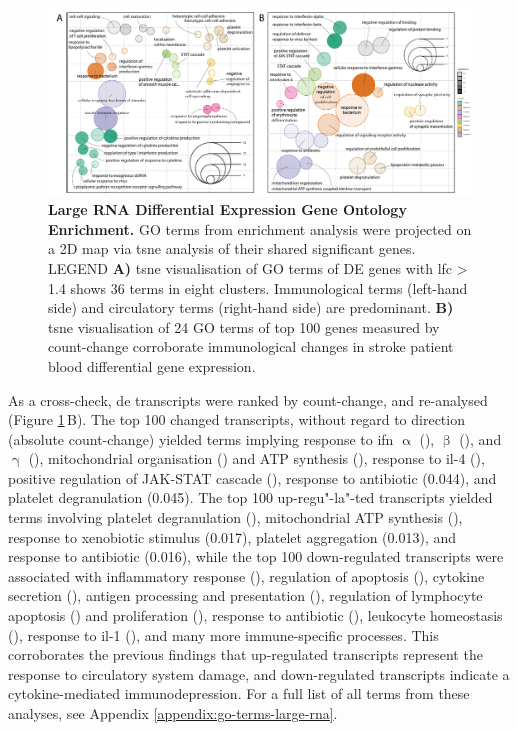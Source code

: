 \begin{figure}
\includegraphics[width=\textwidth]{figures/gsoap-de}
\caption[Large RNA Differential Expression Gene Ontology Enrichment.]{\textbf{Large RNA Differential Expression Gene Ontology Enrichment.} GO terms from enrichment analysis were projected on a 2D map via \acf{tsne} analysis of their shared significant genes. LEGEND \textbf{A)} \ac{tsne} visualisation of GO terms of DE genes with \ac{lfc} > 1.4 shows 36 terms in eight clusters. Immunological terms (left-hand side) and circulatory terms (right-hand side) are predominant. \textbf{B)} \ac{tsne} visualisation of 24 GO terms of top 100 genes measured by count-change corroborate immunological changes in stroke patient blood differential gene expression.
\label{fig:gsoap-de}}
\end{figure}

As a cross-check, \ac{de} transcripts were ranked by count-change, and re-analysed (Figure \ref{fig:gsoap-de}\,B). The top 100 changed transcripts, without regard to direction (absolute count-change) yielded terms implying response to \ac{ifn} $\upalpha$ (), $\upbeta$ (), and $\upgamma$ (), mitochondrial organisation () and ATP synthesis (), response to \ac{il}-4 (), positive regulation of JAK-STAT cascade (), response to antibiotic (0.044), and platelet degranulation (0.045). The top 100 up-regu"-la"-ted transcripts yielded terms involving platelet degranulation (), mitochondrial ATP synthesis (), response to xenobiotic stimulus (0.017), platelet aggregation (0.013), and response to antibiotic (0.016), while the top 100 down-regulated transcripts were associated with inflammatory response (), regulation of apoptosis (), cytokine secretion (), antigen processing and presentation (), regulation of lymphocyte apoptosis () and proliferation (), response to antibiotic (), leukocyte homeostasis (), response to \ac{il}-1 (), and many more immune-specific processes. This corroborates the previous findings that up-regulated transcripts represent the response to circulatory system damage, and down-regulated transcripts indicate a cytokine-mediated immunodepression. For a full list of all terms from these analyses, see Appendix \ref{appendix:go-terms-large-rna}. 

